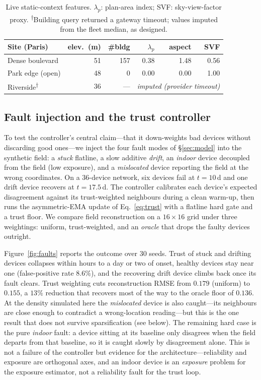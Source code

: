 \documentclass[10pt]{article}
\begin{document}
\begin{table}[t]
\centering
\small
\begin{tabular}{@{}l r r r r r@{}}
\toprule
Site (Paris) & elev.\ (m) & \#bldg & $\lambda_p$ & aspect & SVF \\
\midrule
Dense boulevard & 51 & 157 & 0.38 & 1.48 & 0.56 \\
Park edge (open) & 48 & 0 & 0.00 & 0.00 & 1.00 \\
Riverside\textsuperscript{$\dagger$} & 36 & --- & \multicolumn{3}{c}{\emph{imputed (provider timeout)}} \\
\bottomrule
\end{tabular}
\caption{Live static-context features. $\lambda_p$: plan-area index; SVF:
sky-view-factor proxy. \textsuperscript{$\dagger$}Building query returned a
gateway timeout; values imputed from the fleet median, as designed.}
\label{tab:static}
\end{table}

\subsection{Fault injection and the trust controller}
\label{sec:faults}
To test the controller's central claim---that it down-weights bad devices without
discarding good ones---we inject the four fault modes of \S\ref{sec:model} into the
synthetic field: a \emph{stuck} flatline, a slow additive \emph{drift}, an
\emph{indoor} device decoupled from the field (low exposure), and a
\emph{mislocated} device reporting the field at the wrong coordinates. On a
36-device network, six devices fail at $t=10$\,d and one drift device recovers at
$t=17.5$\,d. The controller calibrates each device's expected disagreement against
its trust-weighted neighbours during a clean warm-up, then runs the asymmetric-EMA
update of Eq.~\eqref{eq:trust} with a flatline hard gate and a trust floor. We
compare field reconstruction on a $16\times16$ grid under three weightings:
uniform, trust-weighted, and an \emph{oracle} that drops the faulty devices
outright.

Figure~\ref{fig:faults} reports the outcome over 30 seeds. Trust of stuck and
drifting devices collapses within hours to a day or two of onset, healthy
devices stay near one (false-positive rate $8.6\%$), and the recovering drift
device climbs back once its fault clears. Trust weighting cuts reconstruction RMSE
from $0.179$ (uniform) to $0.155$, a $13\%$ reduction that recovers most of the way
to the oracle floor of $0.136$. At the density simulated here the \emph{mislocated}
device is also caught---its neighbours are close enough to contradict a
wrong-location reading---but this is the one result that does not survive
sparsification (see below). The remaining hard case is the pure \emph{indoor} fault:
a device sitting at its baseline only disagrees when the field departs from that
baseline, so it is caught slowly by disagreement alone. This is not a failure of
the controller but evidence for the architecture---reliability and exposure are
orthogonal axes, and an indoor device is an \emph{exposure} problem for the
exposure estimator, not a reliability fault for the trust loop.
\end{document}
